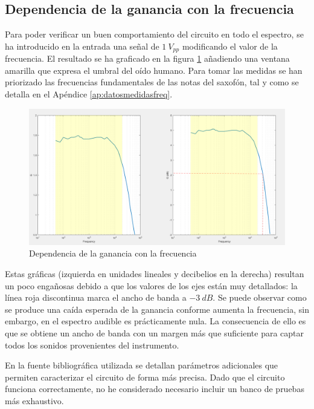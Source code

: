 \subsection{Dependencia de la ganancia con la frecuencia}

Para poder verificar un buen comportamiento del circuito en todo el espectro, se ha introducido en la entrada una señal de $1~V_{pp}$ modificando el valor de la frecuencia. El resultado se ha graficado en la figura \ref{fig:medfreq} añadiendo una ventana amarilla que expresa el umbral del oído humano. Para tomar las medidas se han priorizado las frecuencias fundamentales de las notas del saxofón, tal y como se detalla en el Apéndice \ref{ap:datosmedidasfreq}.

\begin{figure}[!hbt]
\begin{center}
\includegraphics[width=14cm]{img/relaciongf.png}
\caption{\label{fig:medfreq}Dependencia de la ganancia con la frecuencia}
\end{center}
\end{figure}

Estas gráficas (izquierda en unidades lineales y decibelios en la derecha) resultan un poco engañosas debido a que los valores de los ejes están muy detallados: la línea roja discontinua marca el ancho de banda a $-3~dB$. Se puede observar como se produce una caída esperada de la ganancia conforme aumenta la frecuencia, sin embargo, en el espectro audible es prácticamente nula. La consecuencia de ello es que se obtiene un ancho de banda con un margen más que suficiente para captar todos los sonidos provenientes del instrumento. 

En la fuente bibliográfica utilizada \cite{Preamp} se detallan parámetros adicionales que permiten caracterizar el circuito de forma más precisa. Dado que el circuito funciona correctamente, no he considerado necesario incluir un banco de pruebas más exhaustivo.

